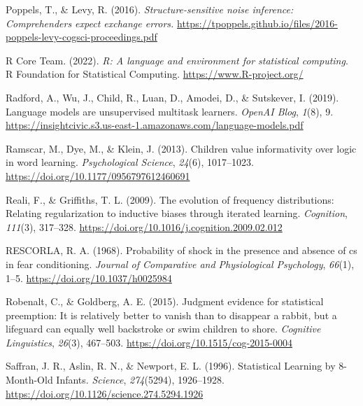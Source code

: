 \documentclass[
  12pt,
  letterpaper,
]{scrreprt}
\newlength{\cslhangindent}
\newenvironment{CSLReferences}[2] %
 {\begin{list}{}{%
  \setlength{\itemindent}{0pt}
  \setlength{\leftmargin}{0pt}
  \setlength{\parsep}{0pt}
  \ifodd #1
   \setlength{\leftmargin}{\cslhangindent}
   \setlength{\itemindent}{-1\cslhangindent}
  \fi
  \setlength{\itemsep}{#2\baselineskip}}}
 {\end{list}}
\begin{document}
\begin{CSLReferences}{1}{0}
Poppels, T., \& Levy, R. (2016). \emph{Structure-sensitive noise
inference: Comprehenders expect exchange errors.}
\url{https://tpoppels.github.io/files/2016-poppels-levy-cogsci-proceedings.pdf}

R Core Team. (2022). \emph{R: A language and environment for statistical
computing}. R Foundation for Statistical Computing.
\url{https://www.R-project.org/}

Radford, A., Wu, J., Child, R., Luan, D., Amodei, D., \& Sutskever, I.
(2019). Language models are unsupervised multitask learners.
\emph{OpenAI Blog}, \emph{1}(8), 9.
\url{https://insightcivic.s3.us-east-1.amazonaws.com/language-models.pdf}

Ramscar, M., Dye, M., \& Klein, J. (2013). Children value informativity
over logic in word learning. \emph{Psychological Science}, \emph{24}(6),
1017--1023. \url{https://doi.org/10.1177/0956797612460691}

Reali, F., \& Griffiths, T. L. (2009). The evolution of frequency
distributions: Relating regularization to inductive biases through
iterated learning. \emph{Cognition}, \emph{111}(3), 317--328.
\url{https://doi.org/10.1016/j.cognition.2009.02.012}

RESCORLA, R. A. (1968). Probability of shock in the presence and absence
of cs in fear conditioning. \emph{Journal of Comparative and
Physiological Psychology}, \emph{66}(1), 1--5.
\url{https://doi.org/10.1037/h0025984}

Robenalt, C., \& Goldberg, A. E. (2015). Judgment evidence for
statistical preemption: It is relatively better to vanish than to
disappear a rabbit, but a lifeguard can equally well backstroke or swim
children to shore. \emph{Cognitive Linguistics}, \emph{26}(3), 467--503.
\url{https://doi.org/10.1515/cog-2015-0004}

Saffran, J. R., Aslin, R. N., \& Newport, E. L. (1996). Statistical
Learning by 8-Month-Old Infants. \emph{Science}, \emph{274}(5294),
1926--1928. \url{https://doi.org/10.1126/science.274.5294.1926}


\end{CSLReferences}
\end{document}
